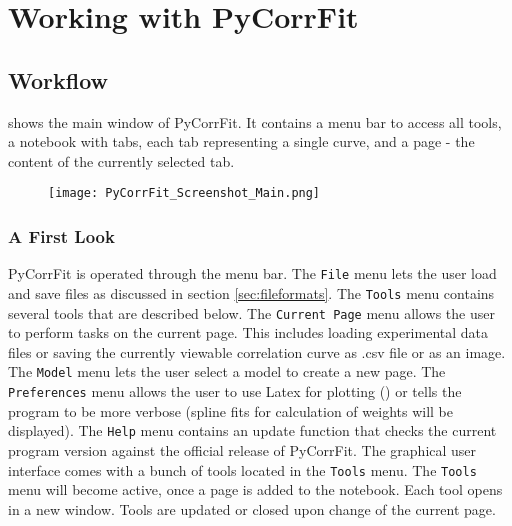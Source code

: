 \section{Working with PyCorrFit}


\subsection{Workflow}
\label{cha_graphint}
\label{sec:PyCorrFitUserInterface}
 shows the main window of PyCorrFit. It contains a menu bar to access all tools, a notebook with tabs, each tab representing a single curve, and a page - the content of the currently selected tab. 
\begin{figure}[h]
\centering
\texttt{[image: PyCorrFit\_Screenshot\_Main.png]}
\end{figure}


\subsubsection{A First Look} PyCorrFit is operated through the menu bar. The \texttt{File} menu lets the user load and save files as discussed in section \ref{sec:fileformats}. The \texttt{Tools} menu contains several tools that are described below. The \texttt{Current Page} menu allows the user to perform tasks on the current page. This includes loading experimental data files or saving the currently viewable correlation curve as \mytilde .csv file or as an image. The \texttt{Model} menu lets the user select a model to create a new page. The \texttt{Preferences} menu allows the user to use Latex for plotting () or tells the program to be more verbose (spline fits for calculation of weights will be displayed). The \texttt{Help} menu contains an update function that checks the current program version against the official release of PyCorrFit.
\label{sec:tools}
The graphical user interface comes with a bunch of tools located in the \texttt{Tools} menu. The \texttt{Tools} menu will become active, once a page is added to the notebook. Each tool opens in a new window. Tools are updated or closed upon change of the current page.


